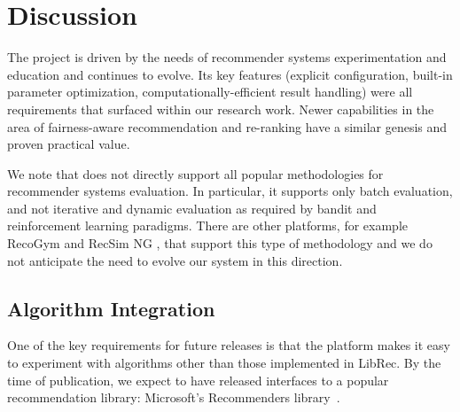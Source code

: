 

                                 


\section{Discussion}
The \libauto{} project is driven by the needs of recommender systems experimentation and education and continues to evolve. Its key features (explicit configuration, built-in parameter optimization, computationally-efficient result handling) were all requirements that surfaced within our research work. Newer capabilities in the area of fairness-aware recommendation and re-ranking have a similar genesis and proven practical value. 

We note that \libauto{} does not directly support all popular methodologies for recommender systems evaluation. In particular, it supports only batch evaluation, and not iterative and dynamic evaluation as required by bandit and reinforcement learning paradigms. There are other platforms, for example RecoGym \cite{rohde2018recogym} and RecSim NG \cite{mladenov2021recsim}, that support this type of methodology and we do not anticipate the need to evolve our system in this direction. 

\subsection{Algorithm Integration}
One of the key requirements for future releases is that the platform makes it easy to experiment with algorithms other than those implemented in LibRec. By the time of publication, we expect to have released interfaces to a popular recommendation library: Microsoft's Recommenders library~\cite{argyriou2020microsoft}. 

